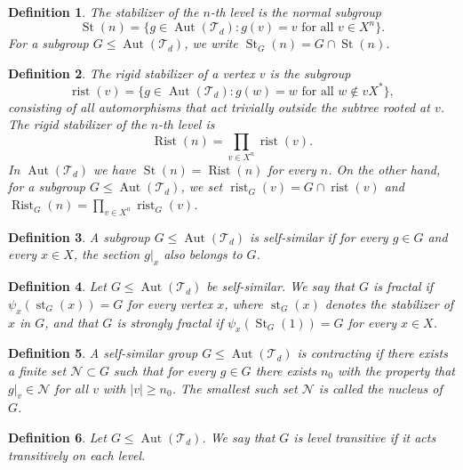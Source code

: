 \documentclass[11pt,leqno]{amsart}
\theoremstyle{plain}
\newtheorem{definition}[definition]{Definition}
\newcommand\T{{\mathcal{T}}}
\DeclareMathOperator{\Aut}{Aut}
\DeclareMathOperator{\St}{St}
\DeclareMathOperator{\Rist}{Rist}
\DeclareMathOperator{\st}{st}
\DeclareMathOperator{\rist}{rist}
\numberwithin{equation}{section}
\begin{document}
\begin{definition}
  The \emph{stabilizer} of the $n$-th level is the normal subgroup
  \[
    \St(n) = \{ g \in \Aut(\T_d) : g(v) = v \text{ for all } v \in X^n \}.
  \]
  For a subgroup $G \leq \Aut(\T_d)$, we write $\St_G(n) = G \cap \St(n)$.
\end{definition}

\begin{definition}
 The \emph{rigid stabilizer} of a vertex $v$ is the subgroup
   \[
     \rist(v) = \{ g \in \Aut(\T_d) : g(w) = w \text{ for all } w \notin v X^* \},
  \]
   consisting of all automorphisms that act trivially outside the subtree rooted at $v$. The \emph{rigid stabilizer of the $n$-th level} is
   \[
     \Rist(n) = \prod_{v \in X^n} \rist(v).
   \]
   In $\Aut(\T_d)$ we have $\St(n)=\Rist(n)$ for every $n$. On the other hand, for a subgroup $G \leq \Aut(\T_d)$, we set $\rist_G(v) = G \cap \rist(v)$ and $\Rist_G(n) = \prod_{v \in X^n} \rist_G(v)$.
 \end{definition}
 


\begin{definition}
  A subgroup $G \leq \Aut(\T_d)$ is \emph{self-similar} if for every $g \in G$ and every $x \in X$, the section $g|_x$ also belongs to $G$. %
 \end{definition}

\begin{definition}\label{defstabvertex}
Let $G\leq \Aut(\T_d)$ be self-similar. We say that $G$ is \emph{fractal} if $\psi_{x}(\st_{G}(x))=G$ for every vertex $x$, where $\st_G(x)$ denotes the stabilizer of $x$ in $G$, and that $G$ is \emph{strongly fractal} if $\psi_{x}(\St_{G}(1))=G$ for every $x\in X$. 
\end{definition}  



\begin{definition}
  A self-similar group $G \leq \Aut(\T_d)$ is \emph{contracting} if there exists a finite set $\mathcal{N} \subset G$ such that for every $g \in G$ there exists $n_0$ with the property that $g|_v \in \mathcal{N}$ for all $v$ with $|v| \geq n_0$. The smallest such set $\mathcal{N}$ is called the \emph{nucleus} of $G$.
\end{definition}

\begin{definition}
   Let $G \leq \Aut(\T_d)$. We say that $G$ is \emph{level transitive} if it acts transitively on each level.
\end{definition}
\end{document}
